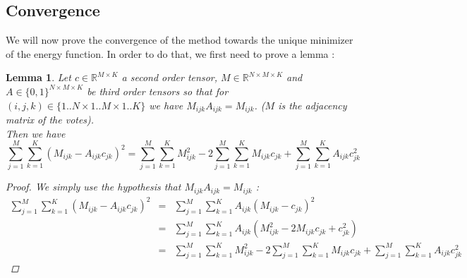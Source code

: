 \documentclass[12pt,a4paper]{article}
\newtheorem{lemma}{Lemma}
\begin{document}
\subsection{Convergence}
We will now prove the convergence of the method towards the unique minimizer of the energy function. In order to do that, we first need to prove a lemma :
\begin{lemma}
Let $c\in \mathbb{R}^{M \times K}$ a second order tensor, $M\in \mathbb{R}^{N\times M \times K}$ and $A\in \{0,1\}^{N\times M \times K}$ be third order tensors so that for $(i,j,k) \in \{1..N \times 1..M \times 1..K \}$ we have $M_{ijk} A_{ijk} = M_{ijk}$. ($M$ is the adjacency matrix of the votes).\\
Then we have 
$$\sum_{j=1}^M \sum_{k=1}^K (M_{ijk}-A_{ijk} c_{jk})^2 = \sum_{j=1}^M \sum_{k=1}^K M_{ijk}^2 - 2\sum_{j=1}^M \sum_{k=1}^K M_{ijk}c_{jk} + \sum_{j=1}^M \sum_{k=1}^K A_{ijk} c_{jk}^2$$
\begin{proof}
We simply use the hypothesis that $M_{ijk}A_{ijk} = M_{ijk}$ :
\begin{eqnarray*}
\sum_{j=1}^M \sum_{k=1}^K (M_{ijk}-A_{ijk} c_{jk})^2 & = & \sum_{j=1}^M \sum_{k=1}^K A_{ijk}(M_{ijk}-c_{jk})^2 \\
& = & \sum_{j=1}^M \sum_{k=1}^K A_{ijk} (M_{ijk}^2 - 2 M_{ijk}c_{jk} + c_{jk}^2)\\
& = & \sum_{j=1}^M \sum_{k=1}^K M_{ijk}^2 - 2\sum_{j=1}^M \sum_{k=1}^K M_{ijk}c_{jk} + \sum_{j=1}^M \sum_{k=1}^K A_{ijk} c_{jk}^2
\end{eqnarray*}
\end{proof}
\label{lemma:tens}
\end{lemma}
\end{document}
